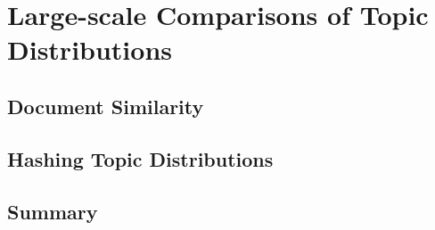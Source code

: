 

\chapter{Large-scale Comparisons of Topic Distributions}\label{ch:comparisons}

\graphicspath{{comparisons/figures/}}


\section{Document Similarity}

\section{Hashing Topic Distributions}

\section{Summary}